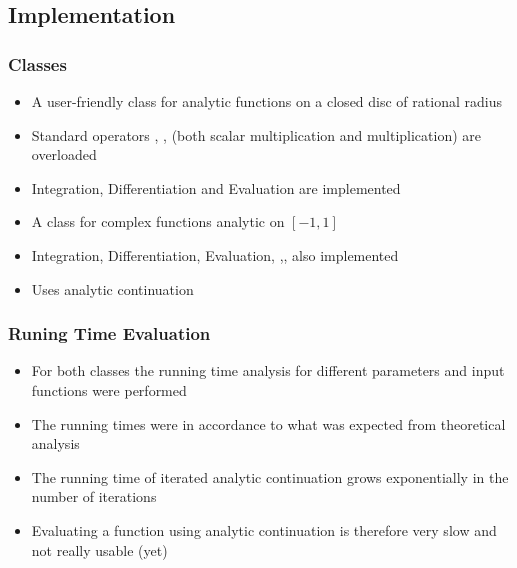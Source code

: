 
\subsection{Implementation}
\begin{frame}
\frametitle{Classes}
\begin{itemize}
\item A user-friendly class for analytic functions on a closed disc of rational radius
\item Standard operators \code{+}, \code{-}, \code{*} (both scalar multiplication and multiplication) are overloaded
\item Integration, Differentiation and Evaluation are implemented
\end{itemize}
\begin{itemize}
\item A class for complex functions analytic on $[-1,1]$
\item Integration, Differentiation, Evaluation, \code{+},\code{-},  \code{*} also implemented  
\item Uses analytic continuation
\end{itemize}
\end{frame}
\begin{frame}[<+->]
\frametitle{Runing Time Evaluation}
\begin{itemize}
	\item For both classes the running time analysis for different parameters and input functions were performed
	\item The running times were in accordance to what was expected from theoretical analysis
	\item The running time of iterated analytic continuation grows exponentially in the number of iterations 
	\item Evaluating a function using analytic continuation is therefore very slow and not really usable (yet)
\end{itemize}
\end{frame}


